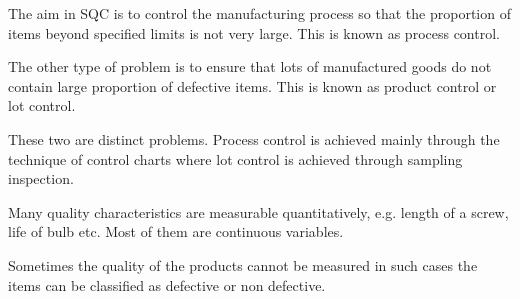 \documentclass[oneside,11pt,pdftex]{book}%
\numberwithin{equation}{section}
\numberwithin{section}{chapter}
\numberwithin{equation}{chapter}
\begin{document}
The aim in SQC is to control the manufacturing process so that the proportion of items beyond specified limits is not very large. This is known as process control.\par
The other type of problem is to ensure that lots of manufactured goods do not contain large proportion of defective items. This is known as product control or lot control.\par
These two are distinct problems.
Process control is achieved mainly through the technique of control charts where lot control is achieved through sampling inspection.\par
Many quality characteristics are measurable quantitatively, e.g. length of a screw, life of bulb etc. Most of them are continuous variables.
\par
Sometimes the quality of the products cannot be measured in such cases the items can be classified as defective or non defective.






\backmatter
\end{document}
